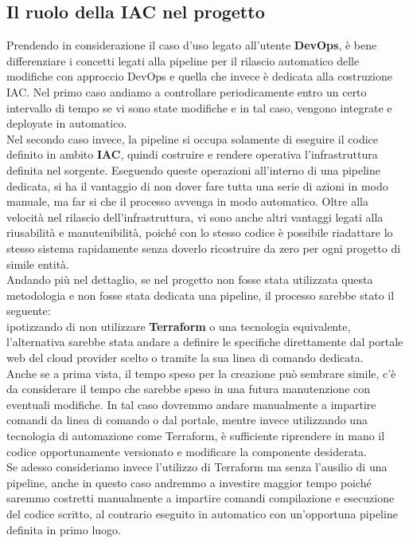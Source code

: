 \documentclass[a4paper,12pt]{report}
\begin{document}
\subsection{Il ruolo della IAC nel progetto}
Prendendo in considerazione il caso d'uso legato all'utente \textbf{DevOps}, è bene differenziare i concetti legati alla pipeline per il rilascio automatico delle modifiche con approccio DevOps e quella che invece è dedicata alla costruzione IAC. Nel primo caso andiamo a controllare periodicamente entro un certo intervallo di tempo se vi sono state modifiche e in tal caso, vengono integrate e deployate in automatico.\\ Nel secondo caso invece, la pipeline si occupa solamente di eseguire il codice definito in ambito \textbf{IAC}, quindi costruire e rendere operativa l'infrastruttura definita nel sorgente. Eseguendo queste operazioni all'interno di una pipeline dedicata, si ha il vantaggio di non dover fare tutta una serie di azioni in modo manuale, ma far si che il processo avvenga in modo automatico. Oltre alla velocità nel rilascio dell'infrastruttura, vi sono anche altri vantaggi legati alla riusabilità e manutenibilità, poiché con lo stesso codice è possibile riadattare lo stesso sistema rapidamente senza doverlo ricostruire da zero per ogni progetto di simile entità. \\
Andando più nel dettaglio, se nel progetto non fosse stata utilizzata questa metodologia e non fosse stata dedicata una pipeline, il processo sarebbe stato il seguente:\\
ipotizzando di non utilizzare \textbf{Terraform} o una tecnologia equivalente, l'alternativa sarebbe stata andare a definire le specifiche direttamente dal portale web del cloud provider scelto o tramite la sua linea di comando dedicata. \\
Anche se a prima vista, il tempo speso per la creazione può sembrare simile, c'è da considerare il tempo che sarebbe speso in una futura manutenzione con eventuali modifiche. In tal caso dovremmo andare manualmente a impartire comandi da linea di comando o dal portale, mentre invece utilizzando una tecnologia di automazione come Terraform, è sufficiente riprendere in mano il codice opportunamente versionato e modificare la componente desiderata.\\
Se adesso consideriamo invece l'utilizzo di Terraform ma senza l'ausilio di una pipeline, anche in questo caso andremmo a investire maggior tempo poiché saremmo costretti manualmente a impartire comandi compilazione e esecuzione del codice scritto, al contrario eseguito in automatico con un'opportuna pipeline definita in primo luogo. \\ 
\end{document}
